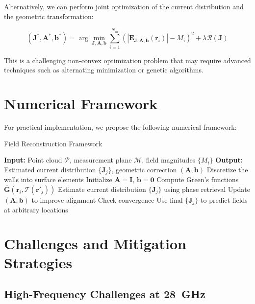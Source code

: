 \documentclass[12pt,a4paper]{article}
\begin{document}
Alternatively, we can perform joint optimization of the current distribution and the geometric transformation:

\begin{equation}
    (\mathbf{J}^*, \mathbf{A}^*, \mathbf{b}^*) = \arg\min_{\mathbf{J}, \mathbf{A}, \mathbf{b}} \sum_{i=1}^{N_m} \left( |\mathbf{E}_{\mathbf{J}, \mathbf{A}, \mathbf{b}}(\mathbf{r}_i)| - M_i \right)^2 + \lambda \mathcal{R}(\mathbf{J})
\end{equation}

This is a challenging non-convex optimization problem that may require advanced techniques such as alternating minimization or genetic algorithms.

\section{Numerical Framework}

For practical implementation, we propose the following numerical framework:

\begin{algorithm}
\caption{Field Reconstruction Framework}
\begin{algorithmic}[1]
\State \textbf{Input:} Point cloud $\mathcal{P}$, measurement plane $\mathcal{M}$, field magnitudes $\{M_i\}$
\State \textbf{Output:} Estimated current distribution $\{\mathbf{J}_j\}$, geometric correction $(\mathbf{A}, \mathbf{b})$
\State Discretize the walls into surface elements
\State Initialize $\mathbf{A} = \mathbf{I}$, $\mathbf{b} = \mathbf{0}$
    \State Compute Green's functions $\bar{\mathbf{G}}(\mathbf{r}_i, \mathcal{T}(\mathbf{r}'_j))$
    \State Estimate current distribution $\{\mathbf{J}_j\}$ using phase retrieval
    \State Update $(\mathbf{A}, \mathbf{b})$ to improve alignment
    \State Check convergence
\EndFor
\State Use final $\{\mathbf{J}_j\}$ to predict fields at arbitrary locations
\end{algorithmic}
\end{algorithm}

\section{Challenges and Mitigation Strategies}

\subsection{High-Frequency Challenges at \SI{28}{\giga\hertz}}
\end{document}
